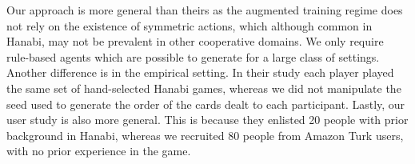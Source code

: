 \documentclass[letterpaper]{article} %
\begin{document}
Our approach is more general than theirs as the  augmented training regime 
does not rely on the existence of symmetric actions, which although common in Hanabi, may not be prevalent in other cooperative domains. We only require rule-based agents which are  possible to generate for a large class of settings. Another difference is in the empirical setting. 
In their study each player played the same set of hand-selected Hanabi games, whereas     we did not manipulate the seed used to generate the order of the cards dealt to each participant.
Lastly, our user study is also more general. This is because they enlisted 20 people with prior background in Hanabi, whereas we recruited 80 people from Amazon Turk users, with no prior experience in the game. %

 
 
\end{document}
